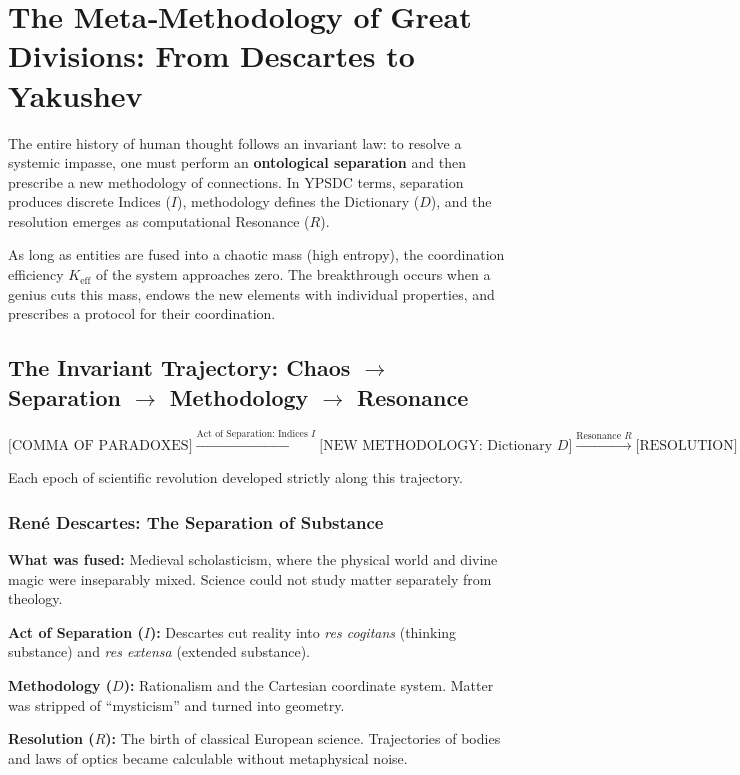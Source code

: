 \documentclass[12pt,a4paper]{article}
\begin{document}
	\section{The Meta‑Methodology of Great Divisions: From Descartes to Yakushev}
	
	The entire history of human thought follows an invariant law: to resolve a systemic impasse, one must perform an \textbf{ontological separation} and then prescribe a new methodology of connections. In YPSDC terms, separation produces discrete Indices (\(I\)), methodology defines the Dictionary (\(D\)), and the resolution emerges as computational Resonance (\(R\)).
	
	As long as entities are fused into a chaotic mass (high entropy), the coordination efficiency \(K_{\mathrm{eff}}\) of the system approaches zero. The breakthrough occurs when a genius cuts this mass, endows the new elements with individual properties, and prescribes a protocol for their coordination.
	
	\subsection{The Invariant Trajectory: Chaos $\rightarrow$ Separation $\rightarrow$ Methodology $\rightarrow$ Resonance}
	
	\[
	\text{[COMMA OF PARADOXES]} \xrightarrow{\text{Act of Separation: Indices } I} \text{[NEW METHODOLOGY: Dictionary } D\text{]} \xrightarrow{\text{Resonance } R} \text{[RESOLUTION]}
	\]
	
	Each epoch of scientific revolution developed strictly along this trajectory.
	
	\subsubsection{René Descartes: The Separation of Substance}
	
	\textbf{What was fused:} Medieval scholasticism, where the physical world and divine magic were inseparably mixed. Science could not study matter separately from theology.
	
	\textbf{Act of Separation (\(I\)):} Descartes cut reality into \emph{res cogitans} (thinking substance) and \emph{res extensa} (extended substance).
	
	\textbf{Methodology (\(D\)):} Rationalism and the Cartesian coordinate system. Matter was stripped of “mysticism” and turned into geometry.
	
	\textbf{Resolution (\(R\)):} The birth of classical European science. Trajectories of bodies and laws of optics became calculable without metaphysical noise.
	
\end{document}
